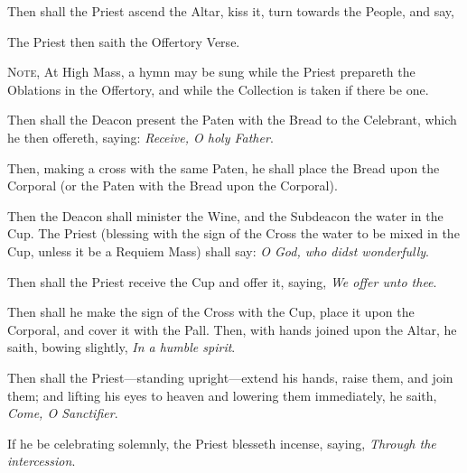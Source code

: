 \begin{rubric}
    Then shall the Priest ascend the Altar, kiss it, turn towards the People, and say,
\end{rubric}
\begin{multicols}{2}    
\begin{rubric}
    The Priest then saith the Offertory Verse.\par
    \textsc{Note,} At High Mass, a hymn may be sung while the Priest prepareth the Oblations in the Offertory, and while the Collection is taken if there be one.
\end{rubric}
\begin{rubric}
    Then shall the Deacon present the Paten with the Bread to the Celebrant, which he then offereth, saying: \emph{Receive, O holy Father}.
\end{rubric}
\begin{rubric} 
    Then, making a cross with the same Paten, he shall place the Bread upon the Corporal (or the Paten with the Bread upon the Corporal).
\end{rubric}
\begin{rubric}
	Then the Deacon shall minister the Wine, and the Subdeacon the water in the Cup. The Priest (blessing with the sign of the Cross the water to be mixed in the Cup, unless it be a Requiem Mass) shall say: \emph{O God, who didst wonderfully}.
\end{rubric}
\begin{rubric}
    Then shall the Priest receive the Cup and offer it, saying, \emph{We offer unto thee}.
\end{rubric}
\begin{rubric}
    Then shall he make the sign of the Cross with the Cup, place it upon the Corporal, and cover it with the Pall. Then, with hands joined upon the Altar, he saith, bowing slightly, \emph{In a humble spirit}.
\end{rubric}
\begin{rubric}
    Then shall the Priest---standing upright---extend his hands, raise them, and join them; and lifting his eyes to heaven and lowering them immediately, he saith, \emph{Come, O Sanctifier}.
\end{rubric}
\begin{rubric}
    If he be celebrating solemnly, the Priest blesseth incense, saying, \emph{Through the intercession}.

\end{rubric}
\end{multicols}
